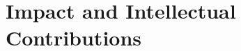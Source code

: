 \documentclass[../Dissertation]{subfiles}
\begin{document}
\section{Impact and Intellectual Contributions}\label{sec:impact}
    \lipsum[1-2]
    
\end{document}
